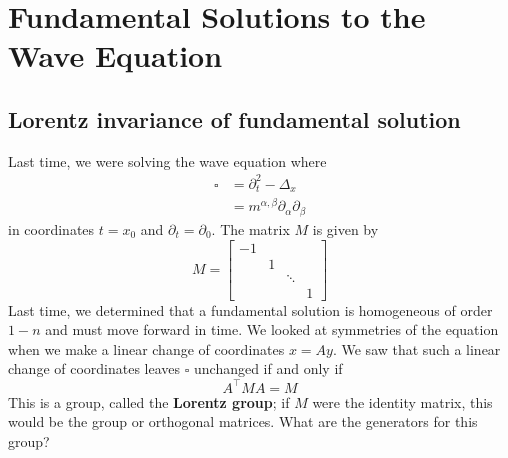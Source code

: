\newpage
\section{Fundamental Solutions to the Wave Equation}

\subsection{Lorentz invariance of fundamental solution}
Last time, we were solving the wave equation
where
$$
\begin{aligned}
\square &=\partial_{t}^{2}-\Delta_{x} \\
&=m^{\alpha, \beta} \partial_{\alpha} \partial_{\beta}
\end{aligned}
$$
in coordinates $t=x_{0}$ and $\partial_{t}=\partial_{0}$. The matrix $M$ is given by
$$
M=\left[\begin{array}{llll}
-1 & & & \\
& 1 & & \\
& & \ddots & \\
& & & 1
\end{array}\right]
$$
Last time, we determined that a fundamental solution is homogeneous of order $1-n$ and must move forward in time. We looked at symmetries of the equation when we make a linear change of coordinates $x=A y$. We saw that such a linear change of coordinates leaves $\square$ unchanged if and only if
$$
A^{\top} M A=M
$$
This is a group, called the \textbf{Lorentz group}; if $M$ were the identity matrix, this would be the group or orthogonal matrices. What are the generators for this group?

